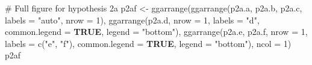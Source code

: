 \documentclass[
  bookmarksnumbered]{article}
\newenvironment{Shaded}{\begin{snugshade}}{\end{snugshade}}
\newcommand{\AttributeTok}[1]{\textcolor[rgb]{0.80,0.80,0.80}{#1}}
\newcommand{\CommentTok}[1]{\textcolor[rgb]{0.50,0.62,0.50}{#1}}
\newcommand{\ConstantTok}[1]{\textcolor[rgb]{0.86,0.64,0.64}{\textbf{#1}}}
\newcommand{\DecValTok}[1]{\textcolor[rgb]{0.86,0.86,0.80}{#1}}
\newcommand{\FunctionTok}[1]{\textcolor[rgb]{0.94,0.94,0.56}{#1}}
\newcommand{\NormalTok}[1]{\textcolor[rgb]{0.80,0.80,0.80}{#1}}
\newcommand{\OtherTok}[1]{\textcolor[rgb]{0.94,0.94,0.56}{#1}}
\newcommand{\StringTok}[1]{\textcolor[rgb]{0.80,0.58,0.58}{#1}}
\begin{document}
\begin{Shaded}
\begin{Highlighting}[]
\CommentTok{\# Full figure for hypothesis 2a}
\NormalTok{p2af }\OtherTok{\textless{}{-}} \FunctionTok{ggarrange}\NormalTok{(}\FunctionTok{ggarrange}\NormalTok{(p2a.a, p2a.b, p2a.c, }
                            \AttributeTok{labels =} \StringTok{"auto"}\NormalTok{,}
                            \AttributeTok{nrow =} \DecValTok{1}\NormalTok{), }
                  \FunctionTok{ggarrange}\NormalTok{(p2a.d,}
                            \AttributeTok{nrow =} \DecValTok{1}\NormalTok{,}
                            \AttributeTok{labels =} \StringTok{"d"}\NormalTok{,}
                            \AttributeTok{common.legend =} \ConstantTok{TRUE}\NormalTok{,}
                            \AttributeTok{legend =} \StringTok{"bottom"}\NormalTok{),}
                  \FunctionTok{ggarrange}\NormalTok{(p2a.e, p2a.f,}
                            \AttributeTok{nrow =} \DecValTok{1}\NormalTok{,}
                            \AttributeTok{labels =} \FunctionTok{c}\NormalTok{(}\StringTok{"e"}\NormalTok{, }\StringTok{"f"}\NormalTok{),}
                            \AttributeTok{common.legend =} \ConstantTok{TRUE}\NormalTok{,}
                            \AttributeTok{legend =} \StringTok{"bottom"}\NormalTok{),}
                            \AttributeTok{ncol =} \DecValTok{1}\NormalTok{)}
\NormalTok{p2af}
\end{Highlighting}
\end{Shaded}
\end{document}
